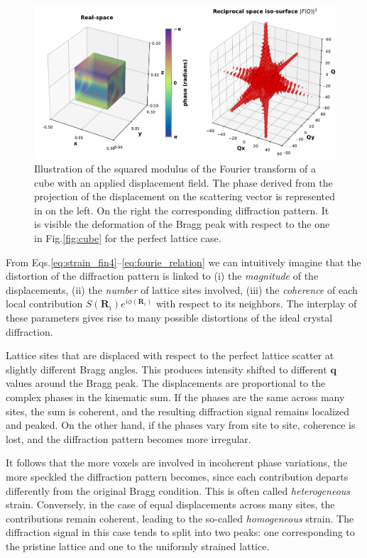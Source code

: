 \begin{figure}[H]
    \centering
    \includegraphics[width=\textwidth]{figures/Intro/cube_hihgstrain.pdf}
    \caption{Illustration of the squared modulus of the Fourier transform of a cube with an applied displacement field. 
    The phase derived from the projection of the displacement on the scattering vector is represented in on the left. On the 
    right the corresponding diffraction pattern. It is visible the deformation of the Bragg peak with respect to the 
    one in Fig.\ref{fig:cube} for the perfect lattice case. }
    \label{fig:cube_strain}
\end{figure}

From Eqs.\ref{eq:strain_fin4}–\ref{eq:fourie_relation} we can intuitively imagine that the distortion of the diffraction 
pattern is linked to (i) the \textit{magnitude} of the displacements, (ii) the \textit{number} of lattice sites involved, 
(iii) the \textit{coherence} of each local contribution $S(\mathbf{R}_i)e^{i\phi(\mathbf{R}_i)}$ with respect to its 
neighbors. The interplay of these parameters gives rise to many possible distortions of the ideal crystal diffraction.

Lattice sites that are displaced with respect to the perfect lattice scatter at slightly different Bragg angles. This 
produces intensity shifted to different $\mathbf{q}$ values around the Bragg peak. The displacements are 
proportional to the complex phases in the kinematic sum. If the phases are the same 
across many sites, the sum is coherent, and the resulting diffraction signal remains localized and peaked. On the 
other hand, if the phases vary from site to site, coherence is lost, and the diffraction pattern becomes more irregular.

It follows that the more voxels are involved in incoherent phase variations, the more speckled the diffraction pattern 
becomes, since each contribution departs differently from the original Bragg condition. This is often called \textit{heterogeneous} 
strain. Conversely, in the case of equal displacements across many sites, the contributions remain coherent, leading to 
the so-called \textit{homogeneous} strain. The diffraction signal in this case tends to split into two peaks: one 
corresponding to the pristine lattice and one to the uniformly strained lattice.

